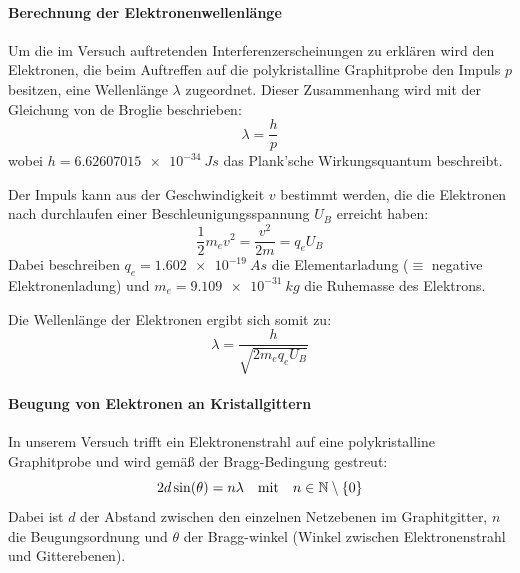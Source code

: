 \documentclass[ngerman]{scrartcl}
\begin{document}
\paragraph{Berechnung der Elektronenwellenlänge}
%
Um die im Versuch auftretenden Interferenzerscheinungen zu erklären wird den Elektronen, die beim Auftreffen auf die polykristalline Graphitprobe den Impuls $p$
besitzen, eine Wellenlänge $\lambda$ zugeordnet. Dieser Zusammenhang wird mit der Gleichung von de Broglie beschrieben:
%
\begin{equation}
    \label{eq:de_broglie}
    \lambda = \frac{h}{p}
\end{equation}
%
wobei $h=\SI{6.62607015e-34}{Js}$ das Plank'sche Wirkungsquantum beschreibt.

Der Impuls kann aus der Geschwindigkeit $v$ bestimmt werden, die die Elektronen nach durchlaufen einer Beschleunigungsspannung $U_B$ erreicht haben:
%
\begin{equation}
    \label{eq:kinetische_energie}
    \frac{1}{2} m_e v^2 = \frac{v^2}{2 m} = q_e U_B
\end{equation}
%
Dabei beschreiben $q_e = \SI{1.602e-19}{As}$ die Elementarladung ($\equiv$ negative Elektronenladung) und $m_e = \SI{9.109e-31}{kg}$ die Ruhemasse des Elektrons.

Die Wellenlänge der Elektronen ergibt sich somit zu:
%
\begin{equation}
    \label{eq:wellenlaenge_elektronen}
    \lambda = \frac{h}{\sqrt{2 m_e q_e U_B}}
\end{equation}

\paragraph{Beugung von Elektronen an Kristallgittern}
%
In unserem Versuch trifft ein Elektronenstrahl auf eine polykristalline Graphitprobe und wird gemäß der Bragg-Bedingung gestreut:
%
\begin{equation}
    \label{eq:bragg}
    2 d \sin(\theta) = n \lambda \qq{mit} n \in \mathbb{N}\setminus\{0\}
\end{equation}
%
Dabei ist $d$ der Abstand zwischen den einzelnen Netzebenen im Graphitgitter, $n$ die Beugungsordnung und $\theta$ der Bragg-winkel (Winkel zwischen Elektronenstrahl und Gitterebenen).
\end{document}
